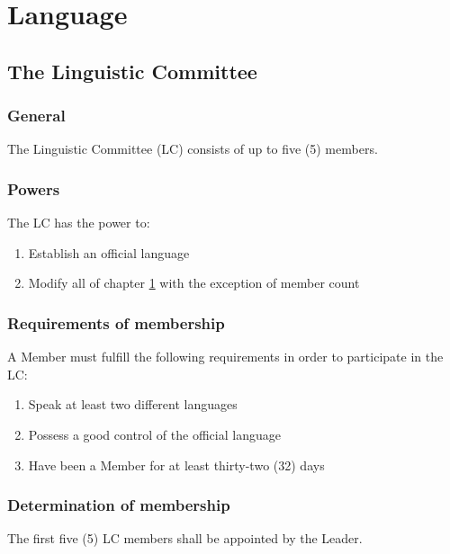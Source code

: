 \documentclass[10pt]{book}
\begin{document}
\chapter{Language}
\label{chapter:language}

\section{The Linguistic Committee}

\subsection{General}

The Linguistic Committee (LC) consists of up to five (5) members.

\subsection{Powers}

The LC has the power to:

\begin{enumerate}
 \item Establish an official language
 \item Modify all of chapter \ref{chapter:language} with the exception of member count
\end{enumerate}

\subsection{Requirements of membership}

A Member must fulfill the following requirements in order to participate in the LC:

\begin{enumerate}
 \item Speak at least two different languages
 \item Possess a good control of the official language
 \item Have been a Member for at least thirty-two (32) days
\end{enumerate}

\subsection{Determination of membership}

The first five (5) LC members shall be appointed by the Leader.
\end{document}
